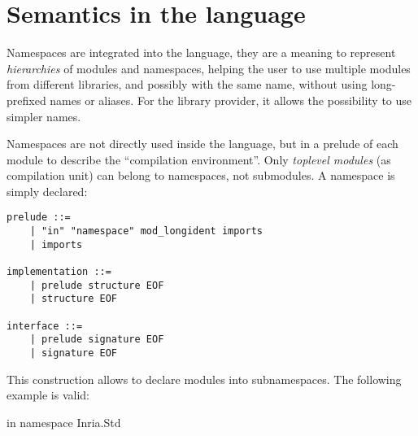\documentclass[11pt,a4paper]{article}
\begin{document}
\section{Semantics in the language}

Namespaces are integrated into the language, they are a meaning to represent
\emph{hierarchies} of modules and namespaces, helping the user to use multiple
modules from different libraries, and possibly with the same name, without using
long-prefixed names or aliases. For the library provider, it allows the
possibility to use simpler names.

Namespaces are not directly used inside the language, but in a prelude of each
module to describe the ``compilation environment''. Only \emph{toplevel modules}
(as compilation unit) can belong to namespaces, not submodules. A namespace is
simply declared: 

\begin{verbatim}
prelude ::=
    | "in" "namespace" mod_longident imports 
    | imports

implementation ::=
    | prelude structure EOF
    | structure EOF

interface ::=
    | prelude signature EOF
    | signature EOF
\end{verbatim}

This construction allows to declare modules into subnamespaces. The following
example is valid:

\begin{OCaml}
in namespace Inria.Std
\end{OCaml}


\end{document}
